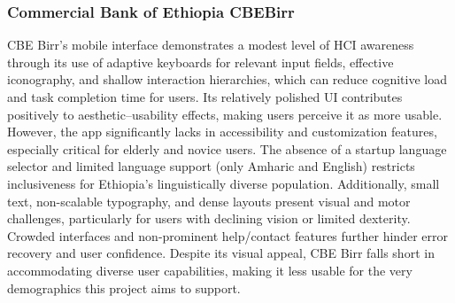 \documentclass[a4paper,12pt]{report}
\begin{document}
\subsubsection{Commercial Bank of Ethiopia CBEBirr}
CBE Birr’s mobile interface demonstrates a modest level of HCI awareness through its use of adaptive keyboards for relevant input fields, effective iconography, and shallow interaction hierarchies, which can reduce cognitive load and task completion time for users. Its relatively polished UI contributes positively to aesthetic–usability effects, making users perceive it as more usable. However, the app significantly lacks in accessibility and customization features, especially critical for elderly and novice users. The absence of a startup language selector and limited language support (only Amharic and English) restricts inclusiveness for Ethiopia’s linguistically diverse population. Additionally, small text, non-scalable typography, and dense layouts present visual and motor challenges, particularly for users with declining vision or limited dexterity. Crowded interfaces and non-prominent help/contact features further hinder error recovery and user confidence. Despite its visual appeal, CBE Birr falls short in accommodating diverse user capabilities, making it less usable for the very demographics this project aims to support.
\end{document}
